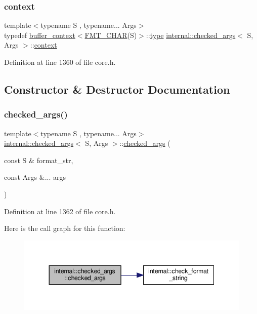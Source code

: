\subsubsection{\texorpdfstring{context}{context}}
{\footnotesize\ttfamily template$<$typename S , typename... Args$>$ \\
typedef \hyperlink{structbuffer__context}{buffer\+\_\+context}$<$\hyperlink{format_8h_a719e8ab6760f525f663de75c59a68ef3}{F\+M\+T\+\_\+\+C\+H\+AR}(S)$>$\+::\hyperlink{namespaceinternal_a8661864098ac0acff9a6dd7e66f59038}{type} \hyperlink{structinternal_1_1checked__args}{internal\+::checked\+\_\+args}$<$ S, Args $>$\+::\hyperlink{structinternal_1_1checked__args_a657828c977dfe543d031ac4323924e3d}{context}}



Definition at line 1360 of file core.\+h.



\subsection{Constructor \& Destructor Documentation}
\mbox{\label{structinternal_1_1checked__args_aed0a5d00ad7384d8646e7794678fbc9c}} 
\subsubsection{\texorpdfstring{checked\+\_\+args()}{checked\_args()}}
{\footnotesize\ttfamily template$<$typename S , typename... Args$>$ \\
\hyperlink{structinternal_1_1checked__args}{internal\+::checked\+\_\+args}$<$ S, Args $>$\+::\hyperlink{structinternal_1_1checked__args}{checked\+\_\+args} (\begin{DoxyParamCaption}\item[{const S \&}]{format\+\_\+str,  }\item[{const Args \&...}]{args }\end{DoxyParamCaption})\hspace{0.3cm}{\ttfamily [inline]}}



Definition at line 1362 of file core.\+h.

Here is the call graph for this function\+:
\nopagebreak
\begin{figure}[H]
\begin{center}
\leavevmode
\includegraphics[width=344pt]{structinternal_1_1checked__args_aed0a5d00ad7384d8646e7794678fbc9c_cgraph}
\end{center}
\end{figure}


